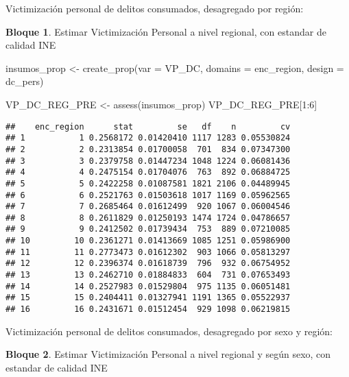 \documentclass[
]{book}
\newenvironment{Shaded}{\begin{snugshade}}{\end{snugshade}}
\newcommand{\AttributeTok}[1]{\textcolor[rgb]{0.77,0.63,0.00}{#1}}
\newcommand{\DecValTok}[1]{\textcolor[rgb]{0.00,0.00,0.81}{#1}}
\newcommand{\FunctionTok}[1]{\textcolor[rgb]{0.00,0.00,0.00}{#1}}
\newcommand{\NormalTok}[1]{#1}
\newcommand{\OtherTok}[1]{\textcolor[rgb]{0.56,0.35,0.01}{#1}}
\newcommand{\SpecialCharTok}[1]{\textcolor[rgb]{0.00,0.00,0.00}{#1}}
\newcommand{\StringTok}[1]{\textcolor[rgb]{0.31,0.60,0.02}{#1}}
\theoremstyle{definition}
\theoremstyle{definition}
\newtheorem{example}{Bloque}[chapter]
\theoremstyle{definition}
\theoremstyle{definition}
\theoremstyle{remark}
\begin{document}
Victimización personal de delitos consumados, desagregado por región:

\begin{example}
\protect\hypertarget{exm:bloque12nbm}{}\label{exm:bloque12nbm}Estimar Victimización Personal a nivel regional, con estandar de calidad INE
\end{example}

\begin{Shaded}
\begin{Highlighting}[]
\NormalTok{insumos\_prop }\OtherTok{\textless{}{-}} \FunctionTok{create\_prop}\NormalTok{(}\AttributeTok{var =} \StringTok{\textquotesingle{}VP\_DC\textquotesingle{}}\NormalTok{, }
                                   \AttributeTok{domains =} \StringTok{\textquotesingle{}enc\_region\textquotesingle{}}\NormalTok{, }
                                   \AttributeTok{design =}\NormalTok{  dc\_pers)}

\NormalTok{VP\_DC\_REG\_PRE }\OtherTok{\textless{}{-}} \FunctionTok{assess}\NormalTok{(insumos\_prop)}
\NormalTok{VP\_DC\_REG\_PRE[}\DecValTok{1}\SpecialCharTok{:}\DecValTok{6}\NormalTok{]}
\end{Highlighting}
\end{Shaded}

\begin{verbatim}
##    enc_region      stat         se   df    n         cv
## 1           1 0.2568172 0.01420410 1117 1283 0.05530824
## 2           2 0.2313854 0.01700058  701  834 0.07347300
## 3           3 0.2379758 0.01447234 1048 1224 0.06081436
## 4           4 0.2475154 0.01704076  763  892 0.06884725
## 5           5 0.2422258 0.01087581 1821 2106 0.04489945
## 6           6 0.2521763 0.01503618 1017 1169 0.05962565
## 7           7 0.2685464 0.01612499  920 1067 0.06004546
## 8           8 0.2611829 0.01250193 1474 1724 0.04786657
## 9           9 0.2412502 0.01739434  753  889 0.07210085
## 10         10 0.2361271 0.01413669 1085 1251 0.05986900
## 11         11 0.2773473 0.01612302  903 1066 0.05813297
## 12         12 0.2396374 0.01618739  796  932 0.06754952
## 13         13 0.2462710 0.01884833  604  731 0.07653493
## 14         14 0.2527983 0.01529804  975 1135 0.06051481
## 15         15 0.2404411 0.01327941 1191 1365 0.05522937
## 16         16 0.2431671 0.01512454  929 1098 0.06219815
\end{verbatim}

Victimización personal de delitos consumados, desagregado por sexo y región:

\begin{example}
\protect\hypertarget{exm:bloque13nbm}{}\label{exm:bloque13nbm}Estimar Victimización Personal a nivel regional y según sexo, con estandar de calidad INE
\end{example}
\end{document}
